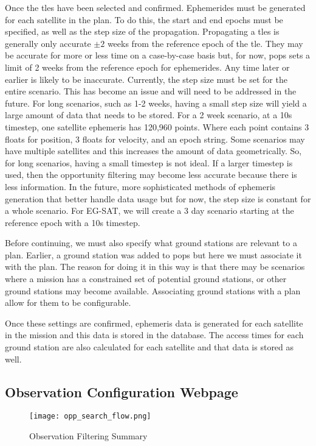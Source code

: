 Once the \glspl{tle} have been selected and confirmed. Ephemerides must be
generated for each satellite in the plan. To do this, the start and end epochs
must be specified, as well as the step size of the propagation. Propagating a
\glspl{tle} is generally only accurate $\pm 2$ weeks from the reference epoch
of the \gls{tle}. They may be accurate for more or less time on a case-by-case
basis but, for now, \gls{pops} sets a limit of 2 weeks from the reference epoch
for ephemerides. Any time later or earlier is likely to be inaccurate.
Currently, the step size must be set for the entire scenario. This has become
an issue and will need to be addressed in the future. For long scenarios, such
as 1-2 weeks, having a small step size will yield a large amount of data that
needs to be stored. For a 2 week scenario, at a 10s timestep, one satellite
ephemeris has 120,960 points.  Where each point contains 3 floats for position,
3 floats for velocity, and an epoch string. Some scenarios may have multiple
satellites and this increases the amount of data geometrically. So, for long
scenarios, having a small timestep is not ideal. If a larger timestep is used,
then the opportunity filtering may become less accurate because there is less
information. In the future, more sophisticated methods of ephemeris generation
that better handle data usage but for now, the step size is constant for a
whole scenario. For EG-SAT, we will create a 3 day scenario starting at the
reference epoch with a 10s timestep. 

Before continuing, we must also specify what ground stations are relevant to a
plan. Earlier, a ground station was added to \gls{pops} but here we must
associate it with the plan. The reason for doing it in this way is that there
may be scenarios where a mission has a constrained set of potential ground
stations, or other ground stations may become available. Associating ground
stations with a plan allow for them to be configurable. 

Once these settings are confirmed, ephemeris data is generated for each
satellite in the mission and this data is stored in the database. The access
times for each ground station are also calculated for each satellite and that
data is stored as well.


\subsection{Observation Configuration Webpage}

\begin{figure}[h]
    \centering
    \texttt{[image: opp\_search\_flow.png]} 
    \caption{Observation Filtering Summary}
    \label{fig:obs_fil} 
\end{figure}

